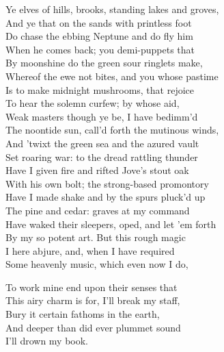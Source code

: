 \begin{verse_speech}[Prospero] 
Ye elves of hills, brooks, standing lakes and groves,\\
And ye that on the sands with printless foot\\
Do chase the ebbing Neptune and do fly him\\
When he comes back; you demi-puppets that\\
By moonshine do the green sour ringlets make,\\
Whereof the ewe not bites, and you whose pastime\\
Is to make midnight mushrooms, that rejoice\\
To hear the solemn curfew; by whose aid,\\
Weak masters though ye be, I have bedimm'd\\
The noontide sun, call'd forth the mutinous winds,\\
And 'twixt the green sea and the azured vault\\
Set roaring war: to the dread rattling thunder\\
Have I given fire and rifted Jove's stout oak\\
With his own bolt; the strong-based promontory\\
Have I made shake and by the spurs pluck'd up\\
The pine and cedar: graves at my command\\
Have waked their sleepers, oped, and let 'em forth\\
By my so potent art. But this rough magic\\
I here abjure, and, when I have required\\
Some heavenly music, which even now I do,\\


To work mine end upon their senses that\\
This airy charm is for, I'll break my staff,\\
Bury it certain fathoms in the earth,\\
And deeper than did ever plummet sound\\
I'll drown my book.
\end{verse_speech}



